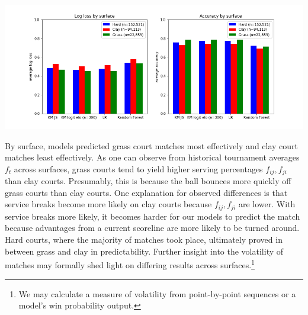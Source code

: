 \documentclass[chapterprefix=false]{report}
\begin{document}
\hspace*{-1.5cm}\includegraphics[scale=.6]{surface_performance3}


By surface, models predicted grass court matches most effectively and clay court matches least effectively. As one can observe from historical tournament averages $f_t$ across surfaces, grass courts tend to yield higher serving percentages $f_{ij},f_{ji}$ than clay courts. Presumably, this is because the ball bounces more quickly off grass courts than clay courts. One explanation for observed differences is that service breaks become more likely on clay courts because $f_{ij},f_{ji}$ are lower. With service breaks more likely, it becomes harder for our models to predict the match because advantages from a current scoreline are more likely to be turned around. Hard courts, where the majority of matches took place, ultimately proved in between grass and clay in predictability. Further insight into the volatility of matches may formally shed light on differing results across surfaces.\footnote{We may calculate a measure of volatility from point-by-point sequences or a model's win probability output.}




\end{document}

